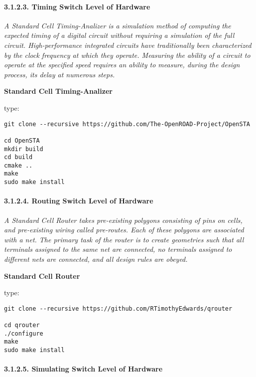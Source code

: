 \documentclass[]{article}
\let\oldparagraph\paragraph
\renewcommand{\paragraph}[1]{\oldparagraph{#1}\mbox{}}
\begin{document}
\hypertarget{timing-switch-level-of-hardware}{%
\paragraph{3.1.2.3. Timing Switch Level of
Hardware}\label{timing-switch-level-of-hardware}}

\emph{A Standard Cell Timing-Analizer is a simulation method of
computing the expected timing of a digital circuit without requiring a
simulation of the full circuit. High-performance integrated circuits
have traditionally been characterized by the clock frequency at which
they operate. Measuring the ability of a circuit to operate at the
specified speed requires an ability to measure, during the design
process, its delay at numerous steps.}

\textbf{Standard Cell Timing-Analizer}

type:

\begin{verbatim}
git clone --recursive https://github.com/The-OpenROAD-Project/OpenSTA

cd OpenSTA
mkdir build
cd build
cmake ..
make
sudo make install
\end{verbatim}

\hypertarget{routing-switch-level-of-hardware}{%
\paragraph{3.1.2.4. Routing Switch Level of
Hardware}\label{routing-switch-level-of-hardware}}

\emph{A Standard Cell Router takes pre-existing polygons consisting of
pins on cells, and pre-existing wiring called pre-routes. Each of these
polygons are associated with a net. The primary task of the router is to
create geometries such that all terminals assigned to the same net are
connected, no terminals assigned to different nets are connected, and
all design rules are obeyed.}

\textbf{Standard Cell Router}

type:

\begin{verbatim}
git clone --recursive https://github.com/RTimothyEdwards/qrouter

cd qrouter
./configure
make
sudo make install
\end{verbatim}

\hypertarget{simulating-switch-level-of-hardware}{%
\paragraph{3.1.2.5. Simulating Switch Level of
Hardware}\label{simulating-switch-level-of-hardware}}
\end{document}
